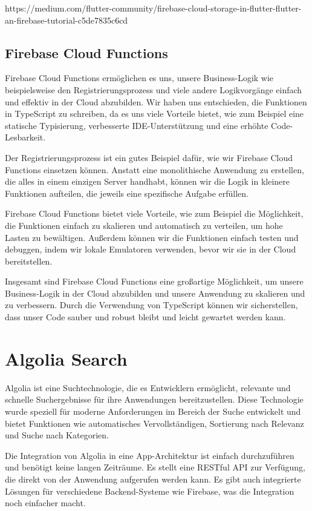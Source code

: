 https://medium.com/flutter-community/firebase-cloud-storage-in-flutter-flutter-an-firebase-tutorial-c5de7835c6cd

\subsection{Firebase Cloud Functions}
Firebase Cloud Functions\cite{firebase-cloud-functions} ermöglichen es uns, unsere Business-Logik wie beispielsweise den Registrierungsprozess und viele andere Logikvorgänge einfach und effektiv in der Cloud abzubilden. Wir haben uns entschieden, die Funktionen in TypeScript zu schreiben, da es uns viele Vorteile bietet, wie zum Beispiel eine statische Typisierung, verbesserte IDE-Unterstützung und eine erhöhte Code-Lesbarkeit.

Der Registrierungsprozess ist ein gutes Beispiel dafür, wie wir Firebase Cloud Functions einsetzen können. Anstatt eine monolithische Anwendung zu erstellen, die alles in einem einzigen Server handhabt, können wir die Logik in kleinere Funktionen aufteilen, die jeweils eine spezifische Aufgabe erfüllen.

Firebase Cloud Functions bietet viele Vorteile, wie zum Beispiel die Möglichkeit, die Funktionen einfach zu skalieren und automatisch zu verteilen, um hohe Lasten zu bewältigen. Außerdem können wir die Funktionen einfach testen und debuggen, indem wir lokale Emulatoren verwenden, bevor wir sie in der Cloud bereitstellen.

Insgesamt sind Firebase Cloud Functions eine großartige Möglichkeit, um unsere Business-Logik in der Cloud abzubilden und unsere Anwendung zu skalieren und zu verbessern. Durch die Verwendung von TypeScript können wir sicherstellen, dass unser Code sauber und robust bleibt und leicht gewartet werden kann.

\section{Algolia Search}\label{sec:algolia}
Algolia ist eine Suchtechnologie, die es Entwicklern ermöglicht, relevante und schnelle Suchergebnisse für ihre Anwendungen bereitzustellen. Diese Technologie wurde speziell für moderne Anforderungen im Bereich der Suche entwickelt und bietet Funktionen wie automatisches Vervollständigen, Sortierung nach Relevanz und Suche nach Kategorien.

Die Integration von Algolia in eine App-Architektur ist einfach durchzuführen und benötigt keine langen Zeiträume. Es stellt eine RESTful API zur Verfügung, die direkt von der Anwendung aufgerufen werden kann. Es gibt auch integrierte Lösungen für verschiedene Backend-Systeme wie Firebase, was die Integration noch einfacher macht.

